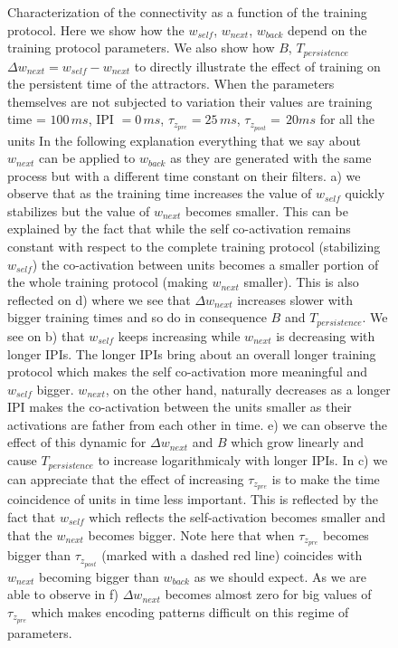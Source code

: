 \documentclass[10pt,a4paper]{article}
\begin{document}
\begin{figure}[H]
\caption{Characterization of the connectivity as a function of the training protocol. Here we show how the $w_{self}$, $w_{next}$, $w_{back}$ depend on the training protocol parameters. We also show how $B$, $T_{persistence}$ $\Delta w_{next} = w_{self} - w_{next}$ to directly illustrate the effect of training on the persistent time of the attractors. When the parameters themselves are not subjected to variation their values are training time = $100 \, ms$, IPI $= 0 \, ms$, $\tau_{z_{pre}}  = 25 \, ms$, $\tau_{z_{post}}= \, 20 ms$ for all the units In the following explanation everything that we say about $w_{next}$ can be applied to $w_{back}$ as they are generated with the same process but with a different time constant on their filters. a) we observe that as the training time increases the value of $w_{self}$ quickly stabilizes but the value of $w_{next}$ becomes smaller. This can be explained by the fact that while the self co-activation remains constant with respect to the complete training protocol (stabilizing $w_{self}$) the co-activation between units becomes a smaller portion of the whole training protocol (making $w_{next}$ smaller). This is also reflected on d) where we see that $\Delta w_{next}$ increases slower with bigger training times and so do in consequence $B$ and $T_{persistence}$.  We see on b) that $w_{self}$ keeps increasing while $w_{next}$ is decreasing with longer IPIs. The longer IPIs bring about an overall longer training protocol which makes the self co-activation more meaningful and $w_{self}$ bigger. $w_{next}$, on the other hand, naturally decreases as a longer IPI makes the co-activation between the units smaller as their activations are father from each other in time. e) we can observe the effect of this dynamic for $\Delta w_{next}$ and $B$ which grow linearly and cause $T_{persistence}$ to increase logarithmicaly with longer IPIs. In c) we can appreciate that the effect of increasing $\tau_{z_{pre}}$ is to make the time coincidence of units in time less important. This is reflected by the fact that $w_{self}$ which reflects the self-activation becomes smaller and that the $w_{next}$ becomes bigger. Note here that when $\tau_{z_{pre}}$ becomes bigger than $\tau_{z_{post}}$ (marked with a dashed red line) coincides with $w_{next}$ becoming bigger than $w_{back}$ as we should expect. As we are able to observe in f) $\Delta w_{next}$ becomes almost zero for big values of $\tau_{z_{pre}}$ which makes encoding patterns difficult on this regime of parameters. }
\label{fig:training}
\end{figure}
\end{document}
